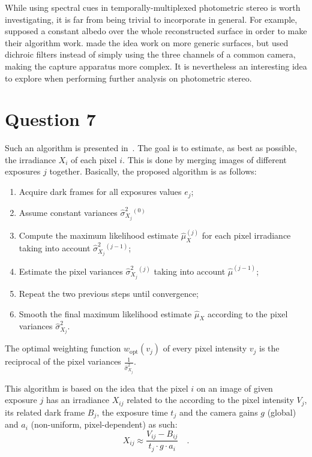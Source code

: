 \documentclass{report}
\begin{document}
While using spectral cues in temporally-multiplexed photometric stereo is worth investigating, it is far from being trivial to incorporate in general. For example, \cite{johnson-cvpr-11} supposed a constant albedo over the whole reconstructed surface in order to make their algorithm work. \cite{Fyffe2011} made the idea work on more generic surfaces, but used dichroic filters instead of simply using the three channels of a common camera, making the capture apparatus more complex. It is nevertheless an interesting idea to explore when performing further analysis on photometric stereo.

\section{Question 7}

Such an algorithm is presented in~\cite{Granados2010a}. The goal is to estimate, as best as possible, the irradiance $X_i$ of each pixel $i$. This is done by merging images of different exposures $j$ together. Basically, the proposed algorithm is as follows:
\begin{enumerate}
  \item{Acquire dark frames for all exposures values $e_j$;}
  \item{Assume constant variances $\hat{\sigma}_{X_j}^2{}^{(0)}$}
  \item{Compute the maximum likelihood estimate $\hat{\mu}_X^{(j)}$ for each pixel irradiance taking into account $\hat{\sigma}_{X_j}^2{}^{(j-1)}$;}
  \item{Estimate the pixel variances $\hat{\sigma}_{X_j}^2{}^{(j)}$ taking into account $\hat{\mu}^{(j-1)}$;}
  \item{Repeat the two previous steps until convergence;}
  \item{Smooth the final maximum likelihood estimate $\hat{\mu}_X$ according to the pixel variances $\hat{\sigma}_{X_j}^2$}.
\end{enumerate}

The optimal weighting function $w_{\mathrm{opt}}\left(v_j\right)$ of every pixel intensity $v_j$ is the reciprocal of the pixel variances $\frac{1}{\hat{\sigma}_{X_j}^2}$.

This algorithm is based on the idea that the pixel $i$ on an image of given exposure $j$ has an irradiance $X_{ij}$ related to the according to the pixel intensity $V_j$, its related dark frame $B_j$, the exposure time $t_j$ and the camera gains $g$ (global) and $a_i$ (non-uniform, pixel-dependent) as such:
\begin{equation}
\label{q7:eqirr}
X_{ij} \approx \frac{V_{ij} - B_{ij}}{t_j \cdot g \cdot a_i}
\quad.
\end{equation}
\end{document}
